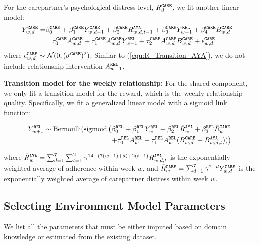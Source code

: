 For the carepartner's psychological distress level, $R^{\tiny\texttt{CARE}}_d$, we fit another linear model:
\begin{align}
    Y_{w,d}^{\tiny\texttt{CARE}} = 
    &\beta_{0}^{\tiny\texttt{CARE}} + \beta_{1}^{\tiny\texttt{CARE}} Y_{w,d-1}^{\tiny\texttt{CARE}} + \beta_{2}^{\tiny\texttt{CARE}} R_{w,d,t-1}^{\tiny\texttt{AYA}}  + 
    \beta_{3}^{\tiny\texttt{CARE}} Y_{w-1}^{\tiny\texttt{REL}} + \beta_{4}^{\tiny\texttt{CARE}} B_{w,d}^{\tiny\texttt{CARE}} + \nonumber \\
    &\quad \tau_{0}^{\tiny\texttt{CARE}} A_{w,d}^{\tiny\texttt{CARE}} +  
    \tau_{1}^{\tiny\texttt{CARE}} A_{w,d}^{\tiny\texttt{CARE}} Y_{w-1}^{\tiny\texttt{REL}} +   
    \tau_{2}^{\tiny\texttt{CARE}} A_{w,d}^{\tiny\texttt{CARE}} B_{w,d}^{\tiny\texttt{CARE}}  + \epsilon_{w,d}^{\tiny\texttt{CARE}} \label{equ:R_transition_care}
\end{align}
where $\epsilon_{w,d}^{\tiny\texttt{CARE}} \sim \mathcal{N}(0, (\sigma^{\tiny\texttt{CARE}})^2)$.  Similar to (\ref{equ:R_Transition_AYA}), we do not include relationship intervention $A_{w-1}^{\tiny\texttt{REL}}$.

\textbf{Transition model for the weekly relationship: } For the shared component, we only fit a transition model for the reward, which is the weekly relationship quality. Specifically, we fit a generalized linear model with a sigmoid link function: 

\begin{align}
Y_{w+1}^{\tiny\texttt{REL}} \sim \text{Bernoulli}(\text{sigmoid}\left( \beta_{0}^{\tiny\texttt{REL}} + \beta_{1}^{\tiny\texttt{REL}}Y_{w}^{\tiny\texttt{REL}}  + \beta_{2}^{\tiny\texttt{REL}} \bar{R}_{w}^{\tiny\texttt{AYA}} + \beta_{3}^{\tiny\texttt{REL}} \bar{R}_{w}^{\tiny\texttt{CARE}} \right. \nonumber \\
\left. + \tau_0^{\tiny\texttt{REL}} A_{w}^{\tiny\texttt{REL}} + \tau_1^{\tiny\texttt{REL}} A_{w}^{\tiny\texttt{REL}} (B_{w,d}^{\tiny\texttt{CARE}} + B_{w,d,t}^{\tiny\texttt{AYA}}))\right)
\label{equ:R_transition_rel}
\end{align}

where $\bar{R}_{w}^{\tiny\texttt{AYA}} = \sum_{d=1}^{7} \sum_{t=1}^{2} \gamma^{14 - (7(w-1) + d) + 2(t-1)} R_{w,d,t}^{\tiny\texttt{AYA}}$ is the exponentially weighted average of adherence within week $w$, and $\bar{R}_{w}^{\tiny\texttt{CARE}} = \sum_{d=1}^{7} \gamma^{7-d} Y_{w,d}^{\tiny\texttt{CARE}}$ is the exponentially weighted average of carepartner distress within week $w$. 

\subsection{Selecting Environment Model Parameters}
\label{sec:select_sim_params}

We list all the parameters that must be either imputed based on domain knowledge or estimated from the existing dataset. 

